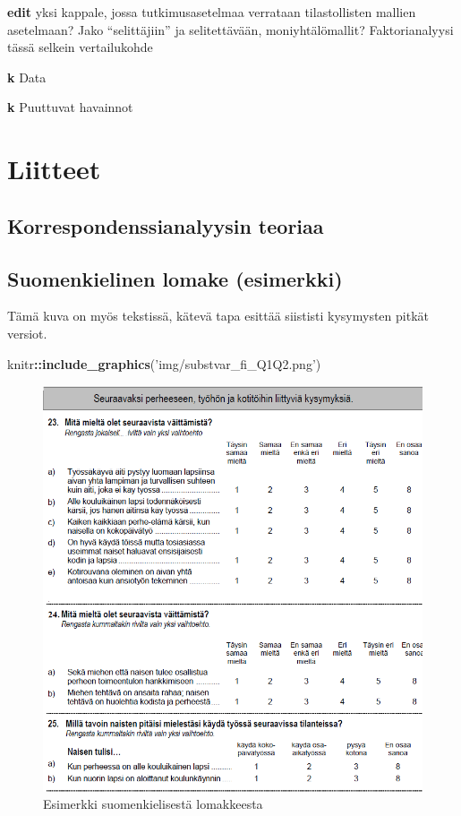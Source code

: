 \documentclass[
  finnish,
]{book}
\newenvironment{Shaded}{\begin{snugshade}}{\end{snugshade}}
\newcommand{\KeywordTok}[1]{\textcolor[rgb]{0.13,0.29,0.53}{\textbf{#1}}}
\newcommand{\NormalTok}[1]{#1}
\newcommand{\OperatorTok}[1]{\textcolor[rgb]{0.81,0.36,0.00}{\textbf{#1}}}
\newcommand{\StringTok}[1]{\textcolor[rgb]{0.31,0.60,0.02}{#1}}
\begin{document}
\textbf{edit} yksi kappale, jossa tutkimusasetelmaa verrataan tilastollisten mallien
asetelmaan? Jako ``selittäjiin'' ja selitettävään, moniyhtälömallit?
Faktorianalyysi tässä selkein vertailukohde

\textbf{k} Data

\textbf{k} Puuttuvat havainnot

\hypertarget{liitteet}{%
\chapter*{Liitteet}\label{liitteet}}

\hypertarget{korrespondenssianalyysin-teoriaa}{%
\section{Korrespondenssianalyysin teoriaa}\label{korrespondenssianalyysin-teoriaa}}

\hypertarget{suomenkielinen-lomake-esimerkki}{%
\section{Suomenkielinen lomake (esimerkki)}\label{suomenkielinen-lomake-esimerkki}}

Tämä kuva on myös tekstissä, kätevä tapa esittää siististi kysymysten pitkät
versiot.

\begin{Shaded}
\begin{Highlighting}[]
\NormalTok{knitr}\OperatorTok{::}\KeywordTok{include_graphics}\NormalTok{(}\StringTok{'img/substvar_fi_Q1Q2.png'}\NormalTok{)}
\end{Highlighting}
\end{Shaded}

\begin{figure}

{\centering \includegraphics[width=0.6\linewidth]{img/substvar_fi_Q1Q2} 

}

\caption{Esimerkki suomenkielisestä lomakkeesta}\label{fig:L1suomlom1}
\end{figure}
\end{document}
